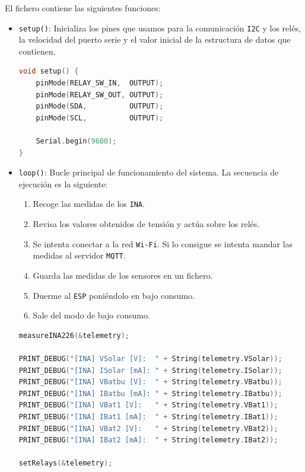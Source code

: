 El fichero contiene las siguientes funciones:

\begin{itemize}
\item \texttt{setup()}: Inicializa los pines que usamos para la comunicación \texttt{I2C} y los relés, la velocidad del puerto serie y el valor inicial de la estructura de datos que contienen.

\begin{lstlisting}[captionpos=b, caption={Codigo de la funcion \texttt{setup}}, language=c++]
void setup() {
    pinMode(RELAY_SW_IN,  OUTPUT);
    pinMode(RELAY_SW_OUT, OUTPUT);
    pinMode(SDA,          OUTPUT);
    pinMode(SCL,          OUTPUT);

    Serial.begin(9600);
}    
\end{lstlisting}

\item \texttt{loop()}: Bucle principal de funcionamiento del sistema. La secuencia de ejecución es la siguiente:
\begin{enumerate}
    \item Recoge las medidas de los \texttt{INA}.
    \item Revisa los valores obtenidos de tensión y actúa sobre los relés.
    \item Se intenta conectar a la red \texttt{Wi-Fi}. Si lo consigue se intenta mandar las medidas al servidor \texttt{MQTT}.
    \item Guarda las medidas de los sensores en un fichero.
    \item Duerme al \texttt{ESP} poniéndolo en bajo consumo.
    \item Sale del modo de bajo consumo.
\end{enumerate}

\begin{lstlisting}[captionpos=b, caption={Codigo de la funcion \texttt{loop}}, language=c++]
measureINA226(&telemetry);

PRINT_DEBUG("[INA] VSolar [V]:  " + String(telemetry.VSolar));
PRINT_DEBUG("[INA] ISolar [mA]: " + String(telemetry.ISolar));
PRINT_DEBUG("[INA] VBatbu [V]:  " + String(telemetry.VBatbu));
PRINT_DEBUG("[INA] IBatbu [mA]: " + String(telemetry.IBatbu));
PRINT_DEBUG("[INA] VBat1 [V]:   " + String(telemetry.VBat1));
PRINT_DEBUG("[INA] IBat1 [mA]:  " + String(telemetry.IBat1));
PRINT_DEBUG("[INA] VBat2 [V]:   " + String(telemetry.VBat2));
PRINT_DEBUG("[INA] IBat2 [mA]:  " + String(telemetry.IBat2));

setRelays(&telemetry);


\end{lstlisting}
\end{itemize}
